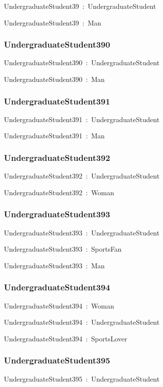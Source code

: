 \documentclass{article}
\begin{document}
UndergraduateStudent39~:~UndergraduateStudent

UndergraduateStudent39~:~Man

\subsubsection*{UndergraduateStudent390}

UndergraduateStudent390~:~UndergraduateStudent

UndergraduateStudent390~:~Man

\subsubsection*{UndergraduateStudent391}

UndergraduateStudent391~:~UndergraduateStudent

UndergraduateStudent391~:~Man

\subsubsection*{UndergraduateStudent392}

UndergraduateStudent392~:~UndergraduateStudent

UndergraduateStudent392~:~Woman

\subsubsection*{UndergraduateStudent393}

UndergraduateStudent393~:~UndergraduateStudent

UndergraduateStudent393~:~SportsFan

UndergraduateStudent393~:~Man

\subsubsection*{UndergraduateStudent394}

UndergraduateStudent394~:~Woman

UndergraduateStudent394~:~UndergraduateStudent

UndergraduateStudent394~:~SportsLover

\subsubsection*{UndergraduateStudent395}

UndergraduateStudent395~:~UndergraduateStudent
\end{document}
